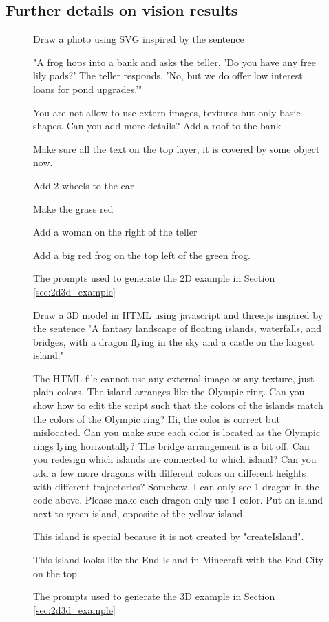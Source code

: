 \subsection{Further details on vision results}\label{sec:visionappendix}

\begin{figure}
\begin{AIbox}{\DV}
Draw a photo using SVG inspired by the sentence

"A frog hops into a bank and asks the teller, 'Do you have any free lily pads?' The teller responds, 'No, but we do offer low interest loans for pond upgrades.'"

You are not allow to use extern images, textures but only basic shapes.
\tcbline
Can you add more details?
\tcbline
Add a roof to the bank

Make sure all the text on the top layer, it is covered by some object now.

Add 2 wheels to the car

Make the grass red

Add a woman on the right of the teller

Add a big red frog on the top left of the green frog.
\end{AIbox}
\caption{The prompts used to generate the 2D example in Section \ref{sec:2d3d_example}}\label{fig:2dprompt}
\end{figure}

\begin{figure}[H]
\begin{AIbox}{\DV}
Draw a 3D model in HTML using javascript and three.js inspired by the sentence "A fantasy landscape of floating islands, waterfalls, and bridges, with a dragon flying in the sky and a castle on the largest island."

The HTML file cannot use any external image or any texture, just plain colors.
\tcbline
The island arranges like the Olympic ring. Can you show how to edit the script such that the colors of the islands match the colors of the Olympic ring?
\tcbline
Hi, the color is correct but mislocated. Can you make sure each color is located as the Olympic rings lying horizontally?
\tcbline
The bridge arrangement is a bit off. Can you redesign which islands are connected to which island?
\tcbline
Can you add a few more dragons with different colors on different heights with different trajectories?
\tcbline
Somehow, I can only see 1 dragon in the code above.
\tcbline
Please make each dragon only use 1 color.
\tcbline
Put an island next to green island, opposite of the yellow island.

This island is special because it is not created by "createIsland".

This island looks like the End Island in Minecraft with the End City on the top.
\end{AIbox}
\caption{The prompts used to generate the 3D example in Section \ref{sec:2d3d_example}}\label{fig:3dprompt}
\end{figure}

